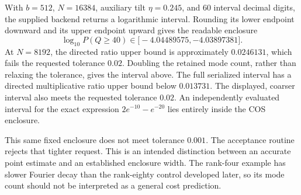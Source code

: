 With $b=512$, $N=16384$, auxiliary tilt $\eta=0.245$, and 60 interval decimal digits, the supplied backend returns a logarithmic interval. Rounding its lower endpoint downward and its upper endpoint upward gives the readable enclosure
\[
\log_{10}P(Q\ge40)\in\bigl[-4.04489575,-4.03897381\bigr].
\]
At $N=8192$, the directed ratio upper bound is approximately $0.0246131$, which fails the requested tolerance $0.02$. Doubling the retained mode count, rather than relaxing the tolerance, gives the interval above. The full serialized interval has a directed multiplicative ratio upper bound below $0.013731$. The displayed, coarser interval also meets the requested tolerance $0.02$. An independently evaluated interval for the exact expression $2e^{-10}-e^{-20}$ lies entirely inside the COS enclosure.

This same fixed enclosure does not meet tolerance $0.001$. The acceptance routine rejects that tighter request. This is an intended distinction between an accurate point estimate and an established enclosure width. The rank-four example has slower Fourier decay than the rank-eighty control developed later, so its mode count should not be interpreted as a general cost prediction.
